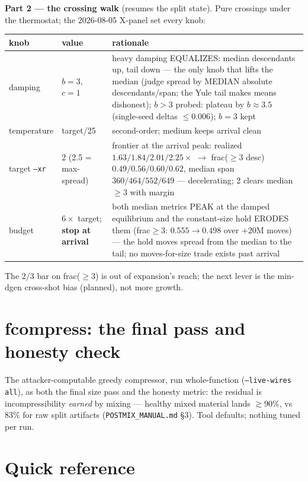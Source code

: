 \documentclass[11pt]{article}
\newcommand{\doc}[1]{\texttt{#1}}
\begin{document}
\textbf{Part 2 --- the crossing walk} (resumes the split state). Pure
crossings under the thermostat; the 2026-08-05 X-panel set every knob:

\begin{table}[H]\small
\begin{tabular}{L{3.0cm} L{3.4cm} L{8.2cm}}
\toprule
knob & value & rationale \\
\midrule
damping & $b=3$, $c=1$ & heavy damping EQUALIZES: median descendants up, tail down --- the only knob that lifts the median (judge spread by MEDIAN absolute descendants/span; the Yule tail makes means dishonest); $b>3$ probed: plateau by $b\approx3.5$ (single-seed deltas $\le0.006$); $b=3$ kept \\
temperature & target/25 & second-order; medium keeps arrival clean \\
target \texttt{--xr} & 2 (2.5 = max-spread) & frontier at the arrival peak: realized $1.63/1.84/2.01/2.25\times$ $\rightarrow$ frac($\ge$3 desc) $0.49/0.56/0.60/0.62$, median span $360/464/552/649$ --- decelerating; 2 clears median $\ge 3$ with margin \\
budget & $6\times$ target; \textbf{stop at arrival} & both median metrics PEAK at the damped equilibrium and the constant-size hold ERODES them (frac$\ge$3: $0.555\to0.498$ over $+20$M moves) --- the hold moves spread from the median to the tail; no moves-for-size trade exists past arrival \\
\bottomrule
\end{tabular}
\end{table}

The $2/3$ bar on frac($\ge$3) is out of expansion's reach; the next lever
is the min-dgen cross-shot bias (planned), not more growth.

\section{fcompress: the final pass and honesty check}

The attacker-computable greedy compressor, run whole-function
(\texttt{--live-wires all}), as both the final size pass and the honesty
metric: the residual is incompressibility \emph{earned} by mixing ---
healthy mixed material lands $\gtrsim 90\%$, vs $83\%$ for raw split
artifacts (\doc{POSTMIX\_MANUAL.md} \S3). Tool defaults; nothing tuned
per run.

\section{Quick reference}
\end{document}
